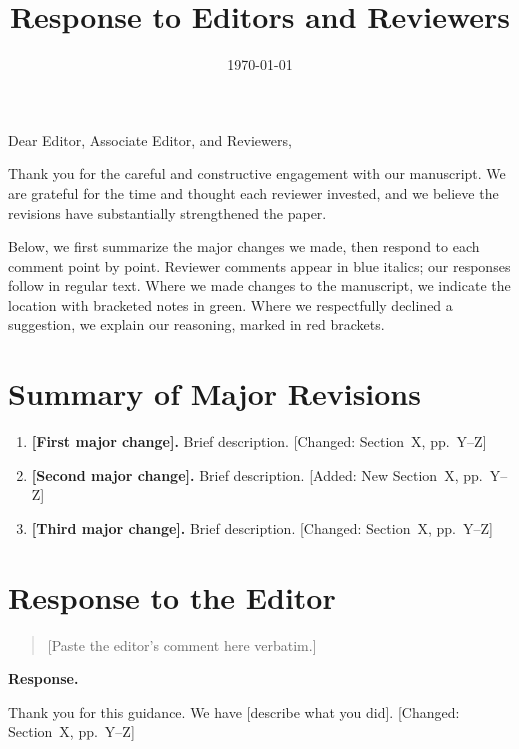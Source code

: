 \documentclass[11pt]{article}
\title{Response to Editors and Reviewers}
\author{}  %
\date{\today}
\newenvironment{editorcomment}{%
  \begin{quote}\color{EditorGray}\itshape
}{%
  \end{quote}
}
\newenvironment{response}{%
  \noindent\textbf{Response.}\quad\ignorespaces
}{%
  \par\medskip
}
\newcommand{\changed}[1]{\textcolor{OliveGreen}{[Changed: #1]}}
\newcommand{\added}[1]{\textcolor{OliveGreen}{[Added: #1]}}
\begin{document}
\maketitle


Dear Editor, Associate Editor, and Reviewers,

Thank you for the careful and constructive engagement with our manuscript.
We are grateful for the time and thought each reviewer invested, and we
believe the revisions have substantially strengthened the paper.

Below, we first summarize the major changes we made, then respond to each
comment point by point. Reviewer comments appear in \textcolor{ReviewerBlue}
{blue italics}; our responses follow in regular text. Where we made changes
to the manuscript, we indicate the location with bracketed notes in
\textcolor{OliveGreen}{green}. Where we respectfully declined a suggestion,
we explain our reasoning, marked in \textcolor{BrickRed}{red brackets}.

\section*{Summary of Major Revisions}

\begin{enumerate}
  \item \textbf{[First major change].} Brief description. \changed{Section~X, pp.~Y--Z}
  \item \textbf{[Second major change].} Brief description. \added{New Section~X, pp.~Y--Z}
  \item \textbf{[Third major change].} Brief description. \changed{Section~X, pp.~Y--Z}
\end{enumerate}

\section*{Response to the Editor}

\begin{editorcomment}
[Paste the editor's comment here verbatim.]
\end{editorcomment}

\begin{response}
Thank you for this guidance. We have [describe what you did].
\changed{Section~X, pp.~Y--Z}
\end{response}
\end{document}
